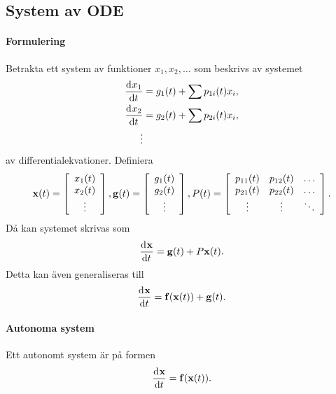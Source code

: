 \subsection{System av ODE}

\paragraph{Formulering}
Betrakta ett system av funktioner $x_{1}, x_{2}, \dots$ som beskrivs av systemet
\begin{align*}
	\dv[]{x_{1}}{t} (t) &= g_{1}(t) + \sum p_{1i}(t)x_{i}, \\
	\dv[]{x_{2}}{t} (t) &= g_{2}(t) + \sum p_{2i}(t)x_{i}, \\
	\vdots
\end{align*}
av differentialekvationer. Definiera
\begin{align*}
	\vb{x}(t) =\left[
	\begin{array}{c}
		x_{1}(t) \\
		x_{2}(t) \\
		\vdots
	\end{array}\right],
	\vb{g}(t) =\left[
	\begin{array}{c}
		g_{1}(t) \\
		g_{2}(t) \\
		\vdots
	\end{array}\right],
	P(t) =\left[
	\begin{array}{ccc}
		p_{11}(t) & p_{12}(t) & \dots \\
		p_{21}(t) & p_{22}(t) & \dots \\
		\vdots    & \vdots    & \ddots
	\end{array}\right].
\end{align*}
Då kan systemet skrivas som
\begin{align*}
	\dv[]{\vb{x}}{t} (t) = \vb{g}(t) + P\vb{x}(t).
\end{align*}
Detta kan även generaliseras till
\begin{align*}
	\dv[]{\vb{x}}{t} (t) = \vb{f}(\vb{x}(t)) + \vb{g}(t).
\end{align*}

\paragraph{Autonoma system}
Ett autonomt system är på formen
\begin{align*}
	\dv[]{\vb{x}}{t} (t) = \vb{f}(\vb{x}(t)).
\end{align*}

